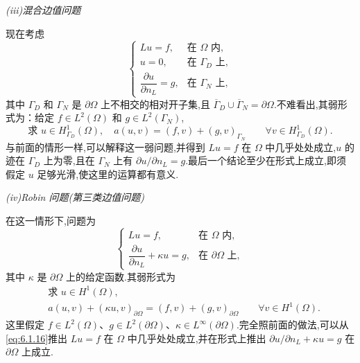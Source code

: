 \medskip
\noindent\textit{(iii)混合边值问题}

现在考虑
\begin{equation}\label{eq:6.1.13}
  \begin{cases}
    Lu=f,&\text{在 }\Omega\text{ 内},\\
    u=0,&\text{在 }\Gamma_D\text{ 上},\\
    \dfrac{\partial u}{\partial n_L}=g,&\text{在 }\Gamma_N\text{ 上},
  \end{cases}
\end{equation}
其中 \(\Gamma_D\) 和 \(\Gamma_N\) 是 \(\partial\Omega\) 上不相交的相对开子集,且 \(\overline\Gamma_D\cup\overline\Gamma_N=\partial\Omega\).不难看出,其弱形式为：给定 \(f\in L^2(\Omega)\) 和 \(g\in L^2(\Gamma_N)\),
\begin{equation}\label{eq:6.1.14}
  \text{求 }u\in H^1_{\Gamma_D}(\Omega),\quad
  a(u,v)=(f,v)+(g,v)_{\Gamma_N}\qquad\forall v\in H^1_{\Gamma_D}(\Omega).
\end{equation}
与前面的情形一样,可以解释这一弱问题,并得到 \(Lu=f\) 在 \(\Omega\) 中几乎处处成立,\(u\) 的迹在 \(\Gamma_D\) 上为零,且在 \(\Gamma_N\) 上有 \(\partial u/\partial n_L=g\).最后一个结论至少在形式上成立,即须假定 \(u\) 足够光滑,使这里的运算都有意义.

\medskip
\noindent\textit{(iv)Robin 问题(第三类边值问题)}

在这一情形下,问题为
\begin{equation}\label{eq:6.1.15}
  \begin{cases}
    Lu=f,&\text{在 }\Omega\text{ 内},\\
    \dfrac{\partial u}{\partial n_L}+\kappa u=g,
     &\text{在 }\partial\Omega\text{ 上},
  \end{cases}
\end{equation}
其中 \(\kappa\) 是 \(\partial\Omega\) 上的给定函数.其弱形式为
\begin{equation}\label{eq:6.1.16}
  \begin{aligned}
    &\text{求 }u\in H^1(\Omega),\\
    &a(u,v)+(\kappa u,v)_{\partial\Omega}
      =(f,v)+(g,v)_{\partial\Omega}\qquad\forall v\in H^1(\Omega).
  \end{aligned}
\end{equation}
这里假定 \(f\in L^2(\Omega)\)、\(g\in L^2(\partial\Omega)\)、\(\kappa\in L^\infty(\partial\Omega)\).完全照前面的做法,可以从\eqref{eq:6.1.16}推出 \(Lu=f\) 在 \(\Omega\) 中几乎处处成立,并在形式上推出 \(\partial u/\partial n_L+\kappa u=g\) 在 \(\partial\Omega\) 上成立.

